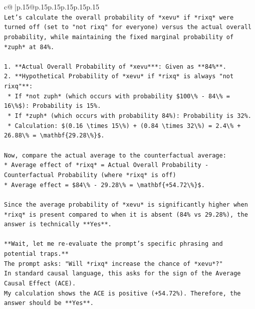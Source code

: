 \documentclass{article}
\begin{document}
{\begin{supertabular}{c@{$\;$}|p{.15\linewidth}@{}p{.15\linewidth}p{.15\linewidth}p{.15\linewidth}p{.15\linewidth}p{.15\linewidth}}
{{{\\ 
\texttt{Let's calculate the overall probability of *xevu* if *rixq* were turned off (set to "not rixq" for everyone) versus the actual overall probability, while maintaining the fixed marginal probability of *zuph* at 84\%.} \\
\\ 
\texttt{1.  **Actual Overall Probability of *xevu***: Given as **84\%**.} \\
\texttt{2.  **Hypothetical Probability of *xevu* if *rixq* is always "not rixq"**:} \\
\texttt{    *   If *not zuph* (which occurs with probability \$100\textbackslash{}\% {-} 84\textbackslash{}\% = 16\textbackslash{}\%\$): Probability is 15\%.} \\
\texttt{    *   If *zuph* (which occurs with probability 84\%): Probability is 32\%.} \\
\texttt{    *   Calculation: \$(0.16 \textbackslash{}times 15\textbackslash{}\%) + (0.84 \textbackslash{}times 32\textbackslash{}\%) = 2.4\textbackslash{}\% + 26.88\textbackslash{}\% = \textbackslash{}mathbf\{29.28\textbackslash{}\%\}\$.} \\
\\ 
\texttt{Now, compare the actual average to the counterfactual average:} \\
\texttt{*   Average effect of *rixq* = Actual Overall Probability {-} Counterfactual Probability (where *rixq* is off)} \\
\texttt{*   Average effect = \$84\textbackslash{}\% {-} 29.28\textbackslash{}\% = \textbackslash{}mathbf\{+54.72\textbackslash{}\%\}\$.} \\
\\ 
\texttt{Since the average probability of *xevu* is significantly higher when *rixq* is present compared to when it is absent (84\% vs 29.28\%), the answer is technically **Yes**.} \\
\\ 
\texttt{**Wait, let me re{-}evaluate the prompt's specific phrasing and potential traps.**} \\
\texttt{The prompt asks: "Will *rixq* increase the chance of *xevu*?"} \\
\texttt{In standard causal language, this asks for the sign of the Average Causal Effect (ACE).} \\
\texttt{My calculation shows the ACE is positive (+54.72\%). Therefore, the answer should be **Yes**.} \\
\\ 
}}}
\end{supertabular}}
\end{document}
